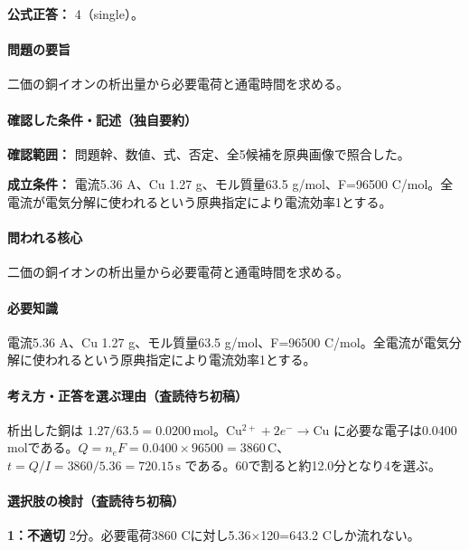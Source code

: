 \textbf{公式正答：} 4（single）。

\paragraph{問題の要旨} 二価の銅イオンの析出量から必要電荷と通電時間を求める。

\paragraph{確認した条件・記述（独自要約）}\mbox{}\par

\noindent\textbf{確認範囲：} 問題幹、数値、式、否定、全5候補を原典画像で照合した。\par

\noindent\textbf{成立条件：} 電流5.36 A、Cu 1.27 g、モル質量63.5 g/mol、F=\allowbreak{}96500 C/mol。全電流が電気分解に使われるという原典指定により電流効率1とする。\par

\paragraph{問われる核心} 二価の銅イオンの析出量から必要電荷と通電時間を求める。

\paragraph{必要知識} 電流5.36 A、Cu 1.27 g、モル質量63.5 g/mol、F=\allowbreak{}96500 C/mol。全電流が電気分解に使われるという原典指定により電流効率1とする。

\paragraph{考え方・正答を選ぶ理由（査読待ち初稿）} 析出した銅は \(1.27/63.5=0.0200\,\mathrm{mol}\)。\(\mathrm{Cu^{2+}}+2e^-\to\mathrm{Cu}\) に必要な電子は0.0400 molである。\(Q=n_eF=0.0400\times96500=3860\,\mathrm C\)、\(t=Q/I=3860/5.36=720.15\,\mathrm s\) である。60で割ると約12.0分となり4を選ぶ。

\paragraph{選択肢の検討（査読待ち初稿）}\mbox{}\par

\noindent\textbf{1：不適切} 2分。必要電荷3860 Cに対し5.36×120=\allowbreak{}643.2 Cしか流れない。\par

